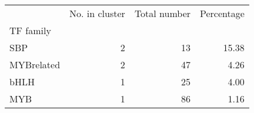 \begin{tabular}{lrrr}
\toprule
{} &  No. in cluster &  Total number &  Percentage \\
TF family  &                 &               &             \\
\midrule
SBP        &               2 &            13 &       15.38 \\
MYBrelated &               2 &            47 &        4.26 \\
bHLH       &               1 &            25 &        4.00 \\
MYB        &               1 &            86 &        1.16 \\
\bottomrule
\end{tabular}
